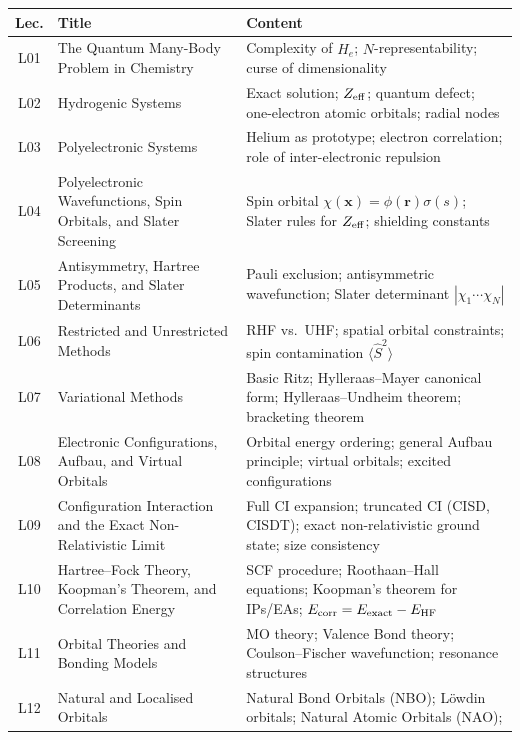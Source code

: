 \documentclass[11pt,a4paper]{article}
\begin{document}
\begin{tcolorbox}[chembox, title={Module~III.2 --- Lecture Overview (Electronic Hamiltonian)}]
\begin{longtable}{clp{7.2cm}}
\toprule
\textbf{Lec.} & \textbf{Title} & \textbf{Content}\\
\midrule
\endhead
L01 & The Quantum Many-Body Problem in Chemistry &
      Complexity of $\hat{H}_e$; $N$-representability; curse of dimensionality\\
L02 & Hydrogenic Systems &
      Exact solution; $Z_{\rm eff}$; quantum defect; one-electron atomic orbitals; radial nodes\\
L03 & Polyelectronic Systems &
      Helium as prototype; electron correlation; role of inter-electronic repulsion\\
L04 & Polyelectronic Wavefunctions, Spin Orbitals, and Slater Screening &
      Spin orbital $\chi(\mathbf{x})=\phi(\mathbf{r})\sigma(s)$;
      Slater rules for $Z_{\rm eff}$; shielding constants\\
L05 & Antisymmetry, Hartree Products, and Slater Determinants &
      Pauli exclusion; antisymmetric wavefunction;
      Slater determinant $|\chi_1\cdots\chi_N|$\\
L06 & Restricted and Unrestricted Methods &
      RHF vs.\ UHF; spatial orbital constraints;
      spin contamination $\langle\hat{S}^2\rangle$\\
L07 & Variational Methods &
      Basic Ritz; Hylleraas--Mayer canonical form;
      Hylleraas--Undheim theorem; bracketing theorem\\
L08 & Electronic Configurations, Aufbau, and Virtual Orbitals &
      Orbital energy ordering; general Aufbau principle;
      virtual orbitals; excited configurations\\
L09 & Configuration Interaction and the Exact Non-Relativistic Limit &
      Full CI expansion; truncated CI (CISD, CISDT);
      exact non-relativistic ground state; size consistency\\
L10 & Hartree--Fock Theory, Koopman's Theorem, and Correlation Energy &
      SCF procedure; Roothaan--Hall equations;
      Koopman's theorem for IPs/EAs;
      $E_{\rm corr}=E_{\rm exact}-E_{\rm HF}$\\
L11 & Orbital Theories and Bonding Models &
      MO theory; Valence Bond theory;
      Coulson--Fischer wavefunction; resonance structures\\
L12 & Natural and Localised Orbitals &
      Natural Bond Orbitals (NBO); L\"owdin orbitals;
      Natural Atomic Orbitals (NAO);

\end{longtable}
\end{tcolorbox}
\end{document}
